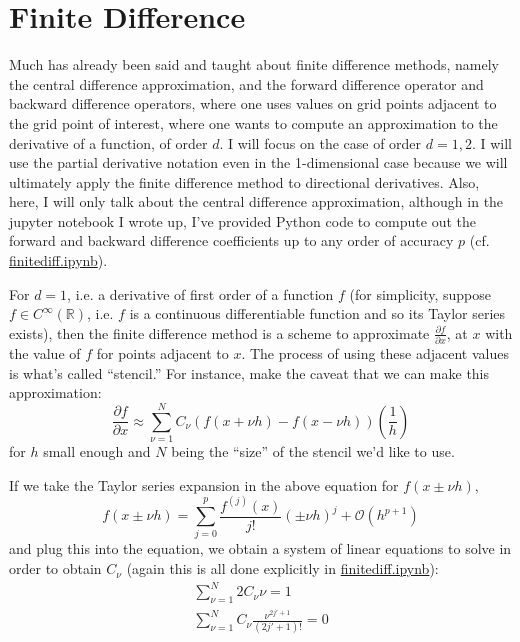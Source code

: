 \documentclass[10pt, landscape]{amsart}
\begin{document}
\pagebreak

\section{Finite Difference}

Much has already been said and taught about finite difference methods, namely the central difference approximation, and the forward difference operator and backward difference operators, where one uses values on grid points adjacent to the grid point of interest, where one wants to compute an approximation to the derivative of a function, of order $d$.  I will focus on the case of order $d=1,2$.  I will use the partial derivative notation even in the 1-dimensional case because we will ultimately apply the finite difference method to directional derivatives.  Also, here, I will only talk about the central difference approximation, although in the jupyter notebook I wrote up, I've provided Python code to compute out the forward and backward difference coefficients up to any order of accuracy $p$ (cf. \href{https://nbviewer.jupyter.org/github/ernestyalumni/CompPhys/blob/master/finitediff.ipynb}{finitediff.ipynb}).

For $d=1$, i.e. a derivative of first order of a function $f$ (for simplicity, suppose $f\in C^{\infty}(\mathbb{R})$, i.e. $f$ is a continuous differentiable function and so its Taylor series exists), then the finite difference method is a scheme to approximate $\frac{ \partial f}{ \partial x}$, at $x$ with the value of $f$ for points adjacent to $x$.  The process of using these adjacent values is what's called ``stencil.''  For instance, make the caveat that we can make this approximation:
\begin{equation}
 \frac{ \partial f}{ \partial x} \approx \sum_{\nu = 1}^N C_{\nu}(f(x+\nu h) - f(x-\nu h)) \left( \frac{1}{h} \right)
\end{equation}
for $h$ small enough and $N$ being the ``size'' of the stencil we'd like to use.

If we take the Taylor series expansion in the above equation for $f(x \pm \nu h)$,
\[
f(x\pm \nu h) = \sum_{j=0}^p \frac{ f^{(j)}(x) }{ j!} (\pm \nu h)^j + \mathcal{O}(h^{p+1})
\]
and plug this into the equation, we obtain a system of linear equations to solve in order to obtain $C_{\nu}$ (again this is all done explicitly in \href{https://nbviewer.jupyter.org/github/ernestyalumni/CompPhys/blob/master/finitediff.ipynb}{finitediff.ipynb}):
\[
\begin{gathered}
  \sum_{\nu = 1}^N 2C_{\nu} \nu  = 1 \\ 
 \sum_{\nu = 1}^N C_{\nu} \frac{ \nu^{2j' + 1 } }{ (2j'+1)! } =0
  \end{gathered}
\]
\end{document}
